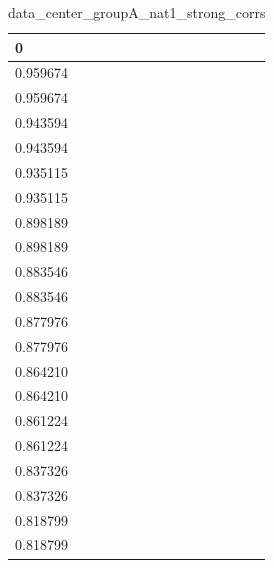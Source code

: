 \begin{table}
\caption{data_center_groupA_nat1_strong_corrs}
\label{tab:data_summary}
\begin{tabular}{lcr}
\toprule
0 \\
\midrule
0.959674 \\
0.959674 \\
0.943594 \\
0.943594 \\
0.935115 \\
0.935115 \\
0.898189 \\
0.898189 \\
0.883546 \\
0.883546 \\
0.877976 \\
0.877976 \\
0.864210 \\
0.864210 \\
0.861224 \\
0.861224 \\
0.837326 \\
0.837326 \\
0.818799 \\
0.818799 \\
\bottomrule
\end{tabular}
\end{table}
